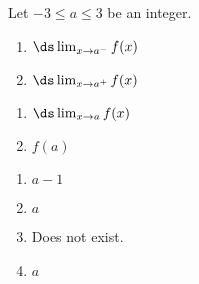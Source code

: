 {
\noindent\begin{minipage}{\linewidth}\centering
{}
\end{minipage}

Let $-3\leq a\leq 3$ be an integer.

\noindent\begin{minipage}[t]{.5\linewidth}
\begin{enumerate}
\item		$\ds \lim_{x\to a^-} f(x)$
\item		$\ds \lim_{x\to a^+} f(x)$
\end{enumerate}
\end{minipage}
\noindent\begin{minipage}[t]{.5\linewidth}
\begin{enumerate}\addtocounter{enumii}{2}
\item		$\ds \lim_{x\to a} f(x)$
\item		$f(a)$\end{enumerate}
\end{minipage}
}
{\begin{enumerate}
\item		$a-1$
\item		$a$
\item		Does not exist.
\item		$a$
\end{enumerate}
}


